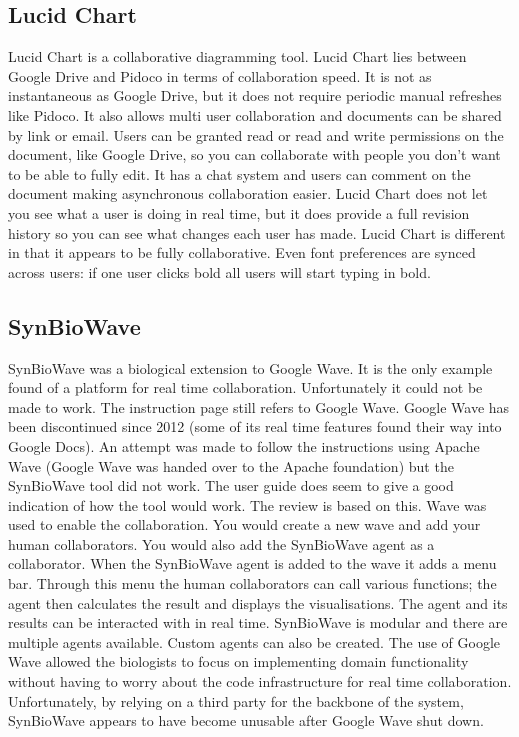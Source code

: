 \subsection{Lucid Chart}
Lucid Chart is a collaborative diagramming tool.  Lucid Chart lies between Google Drive and Pidoco in terms of collaboration speed.  It is not as instantaneous as Google Drive, but it does not require periodic manual refreshes like Pidoco.  It also allows multi user collaboration and documents can be shared by link or email.  Users can be granted read or read and write permissions on the document, like Google Drive, so you can collaborate with people you don't want to be able to fully edit.  It has a chat system and users can comment on the document making asynchronous collaboration easier.  Lucid Chart does not let you see what a user is doing in real time, but it does provide a full revision history so you can see what changes each user has made.  Lucid Chart is different in that it appears to be fully collaborative. Even font preferences are synced across users: if one user clicks bold all users will start typing in bold.

\subsection{SynBioWave}

SynBioWave was a biological extension to Google Wave.  It is the only example found of a platform for real time collaboration.  Unfortunately it could not be made to work.  The instruction page still refers to Google Wave.  Google Wave has been discontinued since 2012 (some of its real time features found their way into Google Docs).  An attempt was made to follow the instructions using Apache Wave (Google Wave was handed over to the Apache foundation) but the SynBioWave tool did not work.  The user guide does seem to give a good indication of how the tool would work.  The review is based on this.  Wave was used to enable the collaboration.  You would create a new wave and add your human collaborators.  You would also add the SynBioWave agent as a collaborator.   When the SynBioWave agent is added to the wave it adds a menu bar. Through this menu the human collaborators can call various functions; the agent then calculates the result and displays the visualisations.  The agent and its results can be interacted with in real time. SynBioWave is modular and there are multiple agents available.  Custom agents can also be created.  The use of Google Wave allowed the biologists to focus on implementing domain functionality without having to worry about the code infrastructure for real time collaboration.  Unfortunately, by relying on a third party for the backbone of the system, SynBioWave appears to have become unusable after Google Wave shut down.


